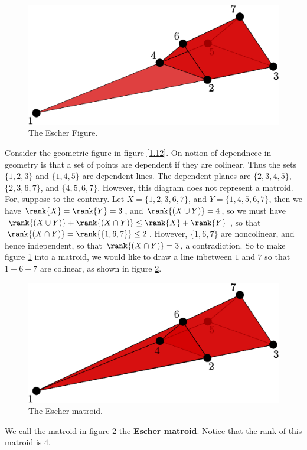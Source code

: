 \begin{example}\label{1.18}
    \begin{figure}[h]
        \centering
        \includegraphics[scale=0.8]{Figures/chapter1/escher_matroid_1.eps}
        \caption{The Escher Figure.}
        \label{fig_1.12}
    \end{figure}
    Consider the geometric figure in figure \ref{1.12}. On notion of dependnece
    in geometry is that a set of points are dependent if they are colinear. Thus
    the sets $\{1,2,3\}$ and $\{1,4,5\}$ are dependent lines. The dependent
    planes are $\{2,3,4,5\}$, $\{2,3,6,7\}$, and $\{4,5,6,7\}$. However, this
    diagram does not represent a matroid. For, suppose to the contrary. Let
    $X=\{1,2,3,6,7\}$, and $Y=\{1,4,5,6,7\}$, then we have
    $\rank{X}=\rank{Y}=3$, and $\rank{(X \cup Y)}=4$, so we must have $\rank{(X
    \cup Y)}+\rank{(X \cap Y)} \leq \rank{X}+\rank{Y}$, so that $\rank{(X \cap
    Y)}=\rank{\{1,6,7\}} \leq 2$. However, $\{1,6,7\}$ are noncolinear, and
    hence independent, so that $\rank{(X \cap Y)}=3$, a contradiction. So to
    make figure \ref{fig_1.12} into a matroid, we would like to draw a line
    inbetween $1$ and  $7$ so that $1-6-7$ are colinear, as shown in figure
    \ref{fig_1.13}.
    \begin{figure}[h]
        \centering
        \includegraphics[scale=0.8]{Figures/chapter1/escher_matroid_2.eps}
        \caption{The Escher matroid.}
        \label{fig_1.13}
    \end{figure}

    We call the matroid in figure \ref{fig_1.13} the \textbf{Escher matroid}.
    Notice that the rank of this matroid is $4$.
\end{example}

